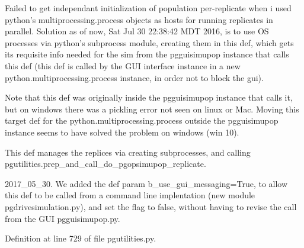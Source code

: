 \begin{DoxyVerb}Failed to get independant initialization of population per-replicate
when i used python's multiprocessing.process objects as hosts for 
running replicates in parallel.  Solution as of now, 
Sat Jul 30 22:38:42 MDT 2016, is to use OS processes via python's 
subprocess module, creating them in this def, which gets its
requisite info needed for the sim from the pgguisimupop instance
that calls this def (this def is called by the GUI interface instance
in a new python.multiprocessing.process instance, in order not to block the gui).

Note that this def was originally inside the pgguisimupop instance that calls it,
but on windows there was a pickling error not seen on linux or Mac.  Moving this
target def for the python.multiprocessing.process outside the pgguisimupop instance
seems to have solved the problem on windows (win 10).

This def manages the replices via creating subprocesses, and 
calling pgutilities.prep_and_call_do_pgopsimupop_replicate.

2017_05_30.  We added the def param b_use_gui_messaging=True, to allow
this def to be called from a command line implentation (new module 
pgdrivesimulation.py), and set the flag to false, without having to
revise the call from the GUI pgguisimupop.py.\end{DoxyVerb}
 

Definition at line 729 of file pgutilities.\+py.


